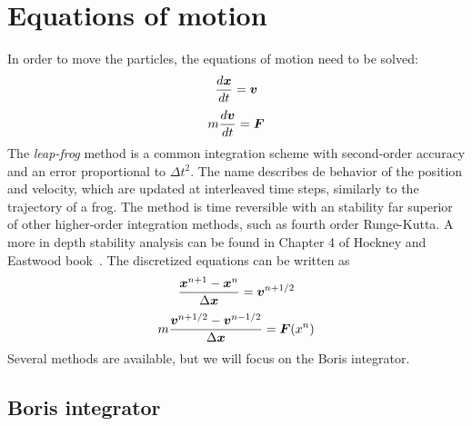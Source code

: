 \section{Equations of motion}

In order to move the particles, the equations of motion need to be solved:
%
\begin{equation}
\frac{d\bm{x}}{dt}=\bm{v}
\end{equation}
\begin{equation}
m \frac{d\bm{v}}{dt} = \bm{F}
\end{equation}
%
The \textit{leap-frog} method is a common integration scheme with second-order 
accuracy and an error proportional to $\Delta t^2$. The name describes de 
behavior of the position and velocity, which are updated at interleaved time 
steps, similarly to the trajectory of a frog. The method is time reversible with 
an stability far superior of other higher-order integration methods, such as 
fourth order Runge-Kutta. A more in depth stability analysis can be found in 
Chapter 4 of Hockney and Eastwood book~\cite{hockney}.  The discretized 
equations can be written as
%
\begin{equation}
\frac{\bm{x}^{n+1} - \bm{x}^{n}}{\Delta \bm{x}} = \bm{v}^{n + 1/2}
\end{equation}
%
\begin{equation}
m\frac{\bm{v}^{n+1/2} - \bm{v}^{n-1/2}}{\Delta \bm{x}} = \bm{F}(x^n)
\end{equation}
%
Several methods are available, but we will focus on the Boris integrator.

\subsection{Boris integrator}

